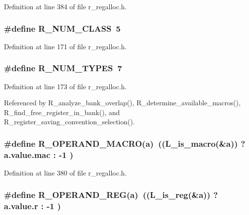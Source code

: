 Definition at line 384 of file r\_\-regalloc.h.
\subsubsection{\setlength{\rightskip}{0pt plus 5cm}\#define R\_\-NUM\_\-CLASS~5}\label{r__regalloc_8h_7c468fc7c6e758b083123b78772165b9}




Definition at line 171 of file r\_\-regalloc.h.
\subsubsection{\setlength{\rightskip}{0pt plus 5cm}\#define R\_\-NUM\_\-TYPES~7}\label{r__regalloc_8h_a5ac30e8fc7a406f73b64bbf5b924d1d}




Definition at line 173 of file r\_\-regalloc.h.

Referenced by R\_\-analyze\_\-bank\_\-overlap(), R\_\-determine\_\-available\_\-macros(), R\_\-find\_\-free\_\-register\_\-in\_\-bank(), and R\_\-register\_\-saving\_\-convention\_\-selection().
\subsubsection{\setlength{\rightskip}{0pt plus 5cm}\#define R\_\-OPERAND\_\-MACRO(a)~((L\_\-is\_\-macro(\&a)) ? a.value.mac : -1 )}\label{r__regalloc_8h_24d56a7af0d814343df22dac0cd562ec}




Definition at line 380 of file r\_\-regalloc.h.
\subsubsection{\setlength{\rightskip}{0pt plus 5cm}\#define R\_\-OPERAND\_\-REG(a)~((L\_\-is\_\-reg(\&a)) ? a.value.r : -1 )}\label{r__regalloc_8h_9e749c2a210dd81a4134f163675a0b2b}




